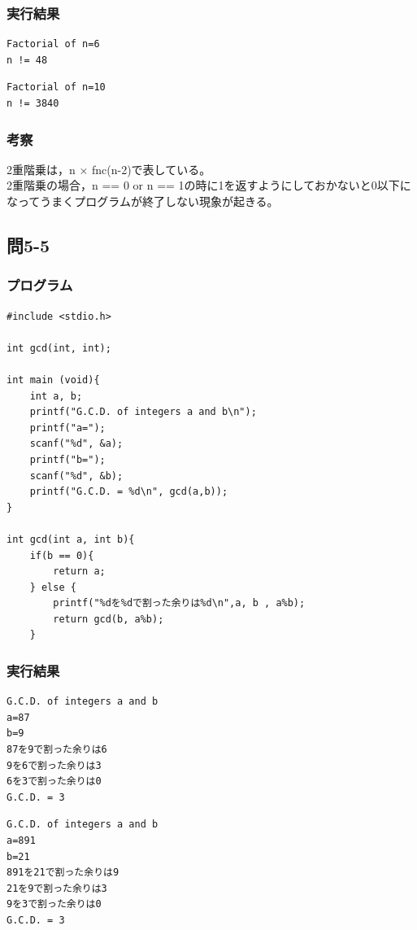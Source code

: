 \documentclass{jarticle}
\begin{document}
\subsubsection{実行結果\\}
\begin{breakbox}
\begin{verbatim}
Factorial of n=6
n != 48
\end{verbatim}
\end{breakbox}
\begin{breakbox}
\begin{verbatim}
Factorial of n=10
n != 3840
\end{verbatim}
\end{breakbox}
\subsubsection{考察\\}
2重階乗は，n × fnc(n-2)で表している。\\
2重階乗の場合，n == 0 or n == 1の時に1を返すようにしておかないと0以下になってうまくプログラムが終了しない現象が起きる。\\

\subsection{問5-5\\}
\subsubsection{プログラム\\}
\begin{breakbox}
\begin{verbatim}
#include <stdio.h>

int gcd(int, int);

int main (void){
    int a, b;
    printf("G.C.D. of integers a and b\n");
    printf("a=");
    scanf("%d", &a);
    printf("b=");
    scanf("%d", &b);
    printf("G.C.D. = %d\n", gcd(a,b));
}

int gcd(int a, int b){
    if(b == 0){
        return a;
    } else {
        printf("%dを%dで割った余りは%d\n",a, b , a%b);
        return gcd(b, a%b);
    }

\end{verbatim}
\end{breakbox}
\subsubsection{実行結果\\}
\begin{breakbox}
\begin{verbatim}
G.C.D. of integers a and b
a=87
b=9
87を9で割った余りは6
9を6で割った余りは3
6を3で割った余りは0
G.C.D. = 3
\end{verbatim}
\end{breakbox}
\begin{breakbox}
\begin{verbatim}
G.C.D. of integers a and b
a=891
b=21
891を21で割った余りは9
21を9で割った余りは3
9を3で割った余りは0
G.C.D. = 3
\end{verbatim}
\end{breakbox}
\end{document}
